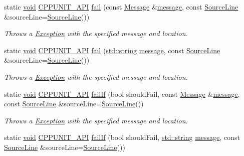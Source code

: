 \begin{DoxyCompactItemize}
\item 
static \hyperlink{wglew_8h_aeea6e3dfae3acf232096f57d2d57f084}{void} \hyperlink{_cpp_unit_api_8h_a0a4ad180f07bc3823bae0e453718ef6a}{C\-P\-P\-U\-N\-I\-T\-\_\-\-A\-P\-I} \hyperlink{struct_asserter_a5a67b6042625cc87d271a53ac555e437}{fail} (const \hyperlink{class_message}{Message} \&\hyperlink{glew_8h_a76333d9470ffdd4811326932394d36da}{message}, const \hyperlink{class_source_line}{Source\-Line} \&source\-Line=\hyperlink{class_source_line}{Source\-Line}())
\begin{DoxyCompactList}\small\item\em Throws a \hyperlink{class_exception}{Exception} with the specified message and location. \end{DoxyCompactList}\item 
static \hyperlink{wglew_8h_aeea6e3dfae3acf232096f57d2d57f084}{void} \hyperlink{_cpp_unit_api_8h_a0a4ad180f07bc3823bae0e453718ef6a}{C\-P\-P\-U\-N\-I\-T\-\_\-\-A\-P\-I} \hyperlink{struct_asserter_a74825fc71909baa1286f9282ba5a2a54}{fail} (\hyperlink{glew_8h_ae84541b4f3d8e1ea24ec0f466a8c568b}{std\-::string} \hyperlink{glew_8h_a76333d9470ffdd4811326932394d36da}{message}, const \hyperlink{class_source_line}{Source\-Line} \&source\-Line=\hyperlink{class_source_line}{Source\-Line}())
\begin{DoxyCompactList}\small\item\em Throws a \hyperlink{class_exception}{Exception} with the specified message and location. \end{DoxyCompactList}\item 
static \hyperlink{wglew_8h_aeea6e3dfae3acf232096f57d2d57f084}{void} \hyperlink{_cpp_unit_api_8h_a0a4ad180f07bc3823bae0e453718ef6a}{C\-P\-P\-U\-N\-I\-T\-\_\-\-A\-P\-I} \hyperlink{struct_asserter_a425da14df34fad7e23a35456fce0eb2b}{fail\-If} (bool should\-Fail, const \hyperlink{class_message}{Message} \&\hyperlink{glew_8h_a76333d9470ffdd4811326932394d36da}{message}, const \hyperlink{class_source_line}{Source\-Line} \&source\-Line=\hyperlink{class_source_line}{Source\-Line}())
\begin{DoxyCompactList}\small\item\em Throws a \hyperlink{class_exception}{Exception} with the specified message and location. \end{DoxyCompactList}\item 
static \hyperlink{wglew_8h_aeea6e3dfae3acf232096f57d2d57f084}{void} \hyperlink{_cpp_unit_api_8h_a0a4ad180f07bc3823bae0e453718ef6a}{C\-P\-P\-U\-N\-I\-T\-\_\-\-A\-P\-I} \hyperlink{struct_asserter_a71a4667a9d3f5d483f1a82157f715824}{fail\-If} (bool should\-Fail, \hyperlink{glew_8h_ae84541b4f3d8e1ea24ec0f466a8c568b}{std\-::string} \hyperlink{glew_8h_a76333d9470ffdd4811326932394d36da}{message}, const \hyperlink{class_source_line}{Source\-Line} \&source\-Line=\hyperlink{class_source_line}{Source\-Line}())

\end{DoxyCompactItemize}
